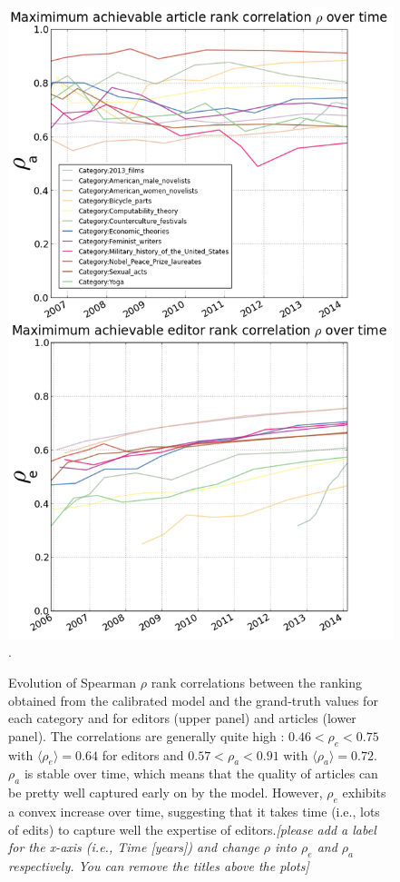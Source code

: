  \begin{figure}[!t]
 \centering
\includegraphics[width=0.9\columnwidth]{Figures/rho_combined.png}.
\caption{Evolution of Spearman $\rho$ rank correlations between the ranking obtained from the calibrated model and the grand-truth values for each category and for editors (upper panel)  and articles (lower panel). The correlations are generally quite high : $ 0.46 < \rho_e < 0.75$ with $\langle \rho_e\rangle = 0.64$ for editors and $0.57 < \rho_a < 0.91$ with $\langle \rho_a\rangle = 0.72$. $\rho_{a}$  is stable over time, which means that the quality of articles can be pretty well captured early on by the model. However, $\rho_e$ exhibits a convex increase over time, suggesting that it takes time (i.e., lots of edits) to capture well the expertise of editors.{\it [please add a label for the x-axis (i.e., Time [years]) and change $\rho$ into $\rho_e$ and $\rho_a$ respectively. You can remove the titles above the  plots]}}
 \label{fig:rhotime}
 \end{figure}



